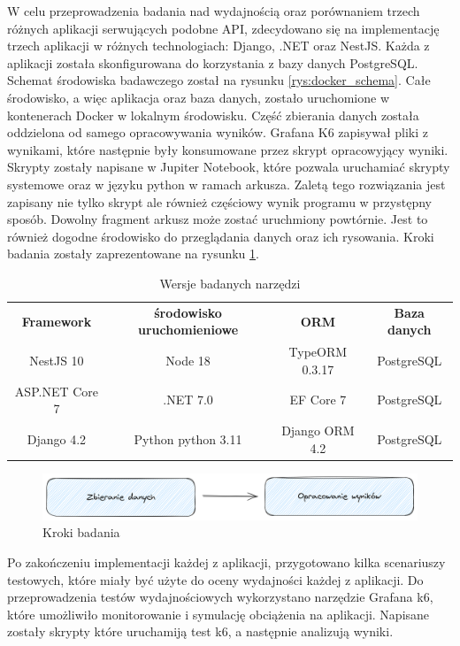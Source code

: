 W celu przeprowadzenia badania nad wydajnością oraz porównaniem trzech różnych aplikacji serwujących podobne API, zdecydowano się na implementację trzech aplikacji w różnych technologiach: Django, .NET oraz NestJS.
Każda z aplikacji została skonfigurowana do korzystania z bazy danych PostgreSQL. Schemat środowiska badawczego został na rysunku \ref{rys:docker_schema}.
Całe środowisko, a więc aplikacja oraz baza danych, zostało uruchomione w kontenerach Docker w lokalnym środowisku.
Część zbierania danych została oddzielona od samego opracowywania wyników.
Grafana K6 zapisywał pliki z wynikami, które następnie były konsumowane przez skrypt opracowyjący wyniki.
Skrypty zostały napisane w Jupiter Notebook, które pozwala uruchamiać skrypty systemowe oraz w języku python w ramach arkusza.
Zaletą tego rozwiązania jest zapisany nie tylko skrypt ale również częściowy wynik programu w przystępny sposób.
Dowolny fragment arkusz może zostać uruchmiony powtórnie.
Jest to również dogodne środowisko do przeglądania danych oraz ich rysowania.
Kroki badania zostały zaprezentowane na rysunku \ref{rys:test_flow}.

\begin{center}
	\begin{table}[h!]
	\begin{tabular}{ |c|c|c|c| } 
		\hline
		\textbf{Framework} & \textbf{środowisko uruchomieniowe} & \textbf{ORM} & \textbf{Baza danych} \\ 
		NestJS 10 & Node 18 & TypeORM 0.3.17 & PostgreSQL \\
		ASP.NET Core 7 & .NET 7.0 & EF Core 7 & PostgreSQL \\ 
		Django 4.2 & Python python 3.11 & Django ORM 4.2 & PostgreSQL \\
		\hline
	\end{tabular}
	\caption{Wersje badanych narzędzi}
	\label{table:version}
	\end{table}
\end{center}


\begin{figure}[!hb]
	\centering \includegraphics[width=1\linewidth]{rysunki/test_flow.png}
	\caption{Kroki badania}
	\label{rys:test_flow}
\end{figure}

Po zakończeniu implementacji każdej z aplikacji, przygotowano kilka scenariuszy testowych, które miały być użyte do oceny wydajności każdej z aplikacji.
Do przeprowadzenia testów wydajnościowych wykorzystano narzędzie Grafana k6, które umożliwiło monitorowanie i symulację obciążenia na aplikacji.
Napisane zostały skrypty które uruchamiją test k6, a następnie analizują wyniki.

